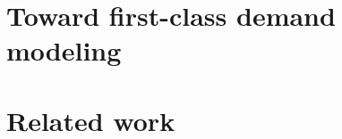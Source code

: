 

\section{Toward first-class demand modeling}          %
\label{sec:agenda}



\section{Related work}                                %
\label{sec:related}


